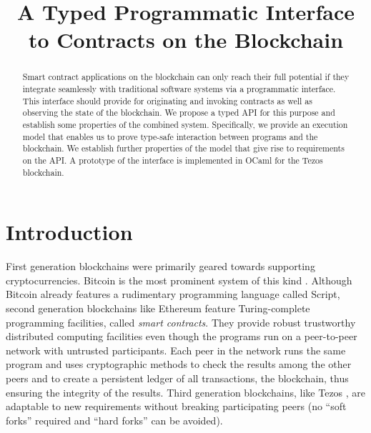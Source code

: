 \documentclass[runningheads]{llncs}
\begin{document}
%
\title{A Typed Programmatic Interface to Contracts on the Blockchain}
%
%

%
\authorrunning{~}
%
%
\maketitle              %
%
\begin{abstract}
  Smart contract applications on the blockchain can only reach their full potential if
  they integrate seamlessly with traditional software systems via a
  programmatic interface. This interface should provide for
  originating and invoking contracts as well as observing the state of
  the blockchain. We propose a typed API for this 
  purpose and establish some properties of the combined
  system. Specifically, we provide an execution model that
  enables us to prove type-safe interaction between programs and the 
  blockchain. We establish further properties of the model that
  give rise to requirements on the API. A prototype of the interface
  is implemented in OCaml for the Tezos blockchain.

\end{abstract}

%
%
%
\section{Introduction}
\label{sec:introduction}
First generation blockchains were primarily geared towards supporting
cryptocurrencies. Bitcoin is the most prominent system of this kind
\cite{bitcoin-whitepaper}. Although Bitcoin already features a
rudimentary programming language called Script, second generation
blockchains like Ethereum \cite{eth-whitepaper} feature
Turing-complete programming facilities, called 
\textit{smart contracts}. They provide robust trustworthy distributed computing
facilities even though the programs run on a peer-to-peer network with
untrusted participants. Each peer in the network runs the same program
and uses cryptographic methods to check the results among the other
peers and to create a persistent ledger of all transactions, the
blockchain, thus ensuring the integrity of the results. Third
generation blockchains, like Tezos \cite{tezos-whitepaper}, are adaptable to
new requirements without breaking participating peers (no  ``soft
forks'' required and ``hard forks'' can be avoided).
\end{document}
